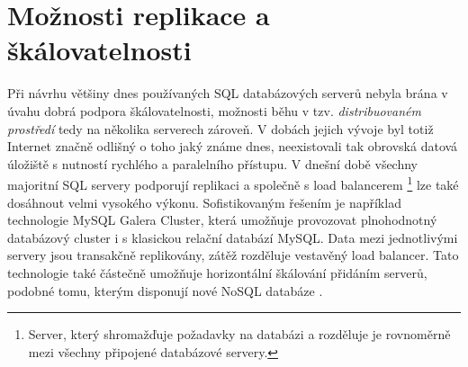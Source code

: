 \section{Možnosti replikace a škálovatelnosti}
Při návrhu většiny dnes používaných SQL databázových serverů nebyla brána v úvahu dobrá podpora škálovatelnosti,  možnosti běhu v tzv. \emph{distribuovaném prostředí} tedy na několika serverech zároveň. V dobách jejich vývoje byl totiž Internet značně odlišný o toho jaký známe dnes, neexistovali tak obrovská datová úložiště s nutností rychlého a paralelního přístupu. V dnešní době všechny majoritní SQL servery podporují replikaci a společně s load balancerem \footnote{Server, který shromažďuje požadavky na databázi a rozděluje je rovnoměrně mezi všechny připojené databázové servery.} lze také dosáhnout velmi vysokého výkonu. Sofistikovaným řešením je například technologie MySQL Galera Cluster, která umožňuje provozovat plnohodnotný databázový cluster i s klasickou relační databází MySQL. Data mezi jednotlivými servery jsou transakčně replikovány, zátěž rozděluje vestavěný load balancer. Tato technologie také částečně umožňuje horizontální škálování přidáním serverů, podobné tomu, kterým disponují nové NoSQL databáze  \cite{galeracluster}.